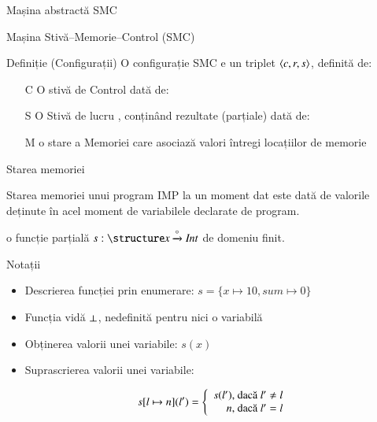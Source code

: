 \documentclass[handout,xcolor=pdftex,romanian,colorlinks]{beamer}
\begin{document}
\begin{section}{Mașina abstractă SMC}
\begin{frame}{Mașina  \alert{S}tivă--\alert{M}emorie--\alert{C}ontrol  (SMC)}
\begin{block}{Definiție (Configurații)}
O configurație SMC e un triplet ${\langle{c, r, s}\rangle}$, definită de:
\begin{itemize}
\item[C] O stivă de \alert{C}ontrol  dată de:
\renewcommand{\syntaxKeyword}{}
\item[S] O \alert{S}tivă de lucru , conținând rezultate (parțiale) dată de:
\item[M] o stare a \alert{M}emoriei  care asociază valori întregi locațiilor de memorie
\end{itemize}
\end{block}
\end{frame}
\begin{frame}{Starea memoriei}
\begin{block}{}
Starea memoriei unui program IMP la un moment dat este dată de valorile deținute în acel moment de variabilele declarate de program.

 o funcție \alert{parțială} $s : \Id \xrightarrow{\circ}\SInt$ de domeniu finit.
\end{block}
\begin{block}{Notații}
\begin{itemize}
\item Descrierea funcției prin enumerare:
$s = \{ x \mapsto 10, sum \mapsto 0\}$
\item Funcția vidă $\perp$, nedefinită pentru nici o variabilă
\item Obținerea valorii unei variabile: $s(x)$
\item Suprascrierea valorii unei variabile:

$$s[l\mapsto n] (l') = \left\{\begin{array}{r@{\mbox{, dacă }}l}
s	(l') & l' \neq l \\
n & l' = l
\end{array}
\right.$$
\end{itemize}
\end{block}
\end{frame}


\end{section}
\end{document}
